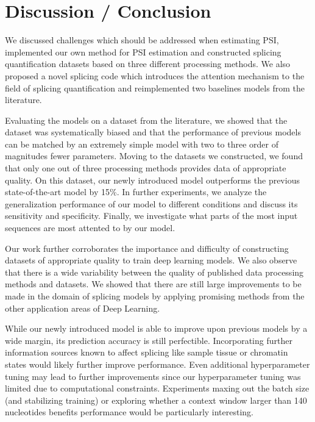 \chapter{\label{ch:6-conclusion}Discussion / Conclusion}


We discussed challenges which should be addressed when estimating PSI, implemented our own method for PSI estimation and constructed splicing quantification datasets based on three different processing methods. We also proposed a novel splicing code which introduces the attention mechanism to the field of splicing quantification and reimplemented two baselines models from the literature.

Evaluating the models on a dataset from the literature, we showed that the dataset was systematically biased and that the performance of previous models can be matched by an extremely simple model with two to three order of magnitudes fewer parameters. 
Moving to the datasets we constructed, we found that only one out of three processing methods provides data of appropriate quality. On this dataset, our newly introduced model outperforms the previous state-of-the-art model by 15\%. In further experiments, we analyze the generalization performance of our model to different conditions and discuss its sensitivity and specificity. Finally, we investigate what parts of the most input sequences are most attented to by our model.

Our work further corroborates the importance and difficulty of constructing datasets of appropriate quality to train deep learning models. We also observe that there is a wide variability between the quality of published data processing methods and datasets. We showed that there are still large improvements to be made in the domain of splicing models by applying promising methods from the other application areas of Deep Learning. 

While our newly introduced model is able to improve upon previous models by a wide margin, its prediction accuracy is still perfectible. Incorporating further information sources known to affect splicing like sample tissue or chromatin states \cite{chromatin} would likely further improve performance. 
Even additional hyperparameter tuning may lead to further improvements since our hyperparameter tuning was limited due to computational constraints. Experiments maxing out the batch size (and stabilizing training) or exploring whether a context window larger than 140 nucleotides benefits performance would be particularly interesting. 

